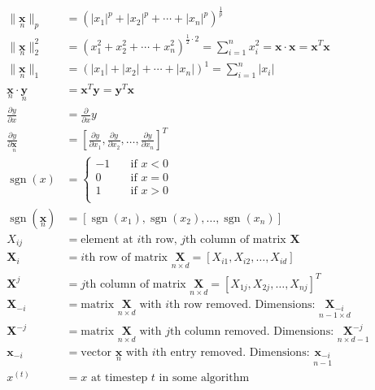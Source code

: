 \newcommand{\matrix}[1]{\mathbf{#1}}
\newcommand{\vector}[1]{\mathbf{#1}}
\DeclareMathOperator{\sgn}{sgn}
\begin{align*}
\|\underset{n}{\vector{x}}\|_p &= \left( |x_1|^p + |x_2|^p + \cdots + |x_n|^p \right)^\frac{1}{p} \\
\|\underset{n}{\vector{x}}\|_2^2 &= \left( x_1^2 + x_2^2 + \cdots + x_n^2 \right)^{\frac{1}{2} \cdot 2} = \sum_{i=1}^{n}{x_i^2} = \vector{x} \cdot \vector{x} = \vector{x}^T\vector{x} \\
\|\underset{n}{\vector{x}}\|_1 &= \left( |x_1| + |x_2| + \cdots + |x_n| \right)^1 = \sum_{i=1}^{n}{|x_i|} \\
\underset{n}{\vector{x}} \cdot \underset{n}{\vector{y}} &= \vector{x}^T\vector{y} = \vector{y}^T\vector{x} \\
\frac{\partial y}{\partial x} &= \frac{\partial}{\partial x}y \\
\frac{\partial y}{\partial \underset{n}{\vector{x}}} &= \left[ \frac{\partial y}{\partial x_1}, \frac{\partial y}{\partial x_2}, \ldots, \frac{\partial y}{\partial x_n} \right]^T \\
\sgn(x) &=
\begin{cases}
    -1 & \quad \text{if } x < 0 \\
     0 & \quad \text{if } x = 0 \\
     1 & \quad \text{if } x > 0 \\
\end{cases} \\
\sgn(\underset{n}{\vector{x}}) &= \left[ \sgn(x_1), \sgn(x_2), \ldots, \sgn(x_n) \right] \\
X_{ij} &= \text{element at } i\text{th row, } j\text{th column of matrix } \matrix{X} \\
\matrix{X}_i &= i\text{th row of matrix } \underset{n \times d}{\matrix{X}} = \left[ X_{i1}, X_{i2}, \ldots, X_{id} \right] \\
\matrix{X}^j &= j\text{th column of matrix } \underset{n \times d}{\matrix{X}} = \left[ X_{1j}, X_{2j}, \ldots, X_{nj} \right]^T \\
\matrix{X}_{-i} &= \text{matrix } \underset{n \times d}{\matrix{X}} \text{ with } i\text{th row removed. Dimensions: } \underset{n-1 \times d}{\matrix{X}_{-i}} \\
\matrix{X}^{-j} &= \text{matrix } \underset{n \times d}{\matrix{X}} \text{ with } j\text{th column removed. Dimensions: } \underset{n \times d-1}{\matrix{X}^{-j}} \\
\vector{x}_{-i} &= \text{vector } \underset{n}{\matrix{x}} \text{ with } i\text{th entry removed. Dimensions: } \underset{n-1}{\vector{x}_{-i}} \\
x^{(t)} &= x \text{ at timestep } t \text{ in some algorithm}
\end{align*}
